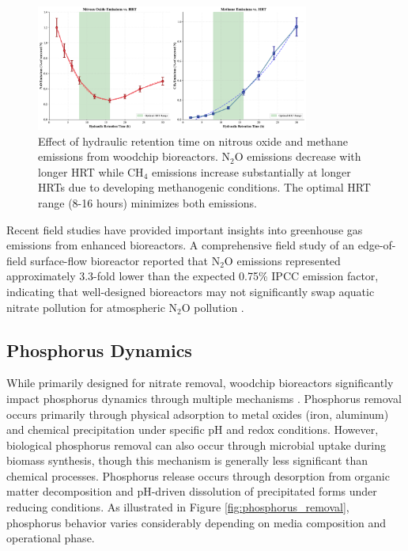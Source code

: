 \documentclass[12pt,a4paper]{article}
\begin{document}
\begin{figure}[ht]
\centering
\includegraphics[width=0.8\textwidth]{fig6_greenhouse_gas_scientific}
\caption{Effect of hydraulic retention time on nitrous oxide and methane emissions from woodchip bioreactors. N$_2$O emissions decrease with longer HRT while CH$_4$ emissions increase substantially at longer HRTs due to developing methanogenic conditions. The optimal HRT range (8-16 hours) minimizes both emissions.}
\label{fig:greenhouse_gas}
\end{figure}

Recent field studies have provided important insights into greenhouse gas emissions from enhanced bioreactors. A comprehensive field study of an edge-of-field surface-flow bioreactor reported that N$_{2}$O emissions represented approximately 3.3-fold lower than the expected 0.75\% IPCC emission factor, indicating that well-designed bioreactors may not significantly swap aquatic nitrate pollution for atmospheric N$_{2}$O pollution \citep{RN1181}.

\subsection{Phosphorus Dynamics}

While primarily designed for nitrate removal, woodchip bioreactors significantly impact phosphorus dynamics through multiple mechanisms \citep{RN370, RN291}. Phosphorus removal occurs primarily through physical adsorption to metal oxides (iron, aluminum) and chemical precipitation under specific pH and redox conditions. However, biological phosphorus removal can also occur through microbial uptake during biomass synthesis, though this mechanism is generally less significant than chemical processes. Phosphorus release occurs through desorption from organic matter decomposition and pH-driven dissolution of precipitated forms under reducing conditions. As illustrated in Figure \ref{fig:phosphorus_removal}, phosphorus behavior varies considerably depending on media composition and operational phase.
\end{document}
